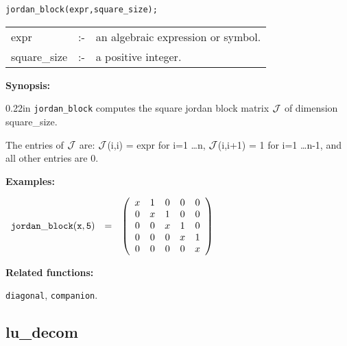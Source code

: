 
\hspace*{0.175in} {\tt jordan\_block(expr,square\_size);}

\hspace*{0.1in} 
\begin{tabular}{l l l}
expr        &:-& an algebraic expression or symbol. \\
square\_size &:-& a positive integer.
\end{tabular}

{\bf Synopsis:} %

\begin{addtolength}{\leftskip}{0.22in}
{\tt jordan\_block} computes the square jordan block matrix ${\cal J}$
                of dimension square\_size. 

The entries of ${\cal J}$ are:
                ${\cal J}$(i,i) = expr for i=1 
                \ldots n, ${\cal J}$(i,i+1) = 1 for i=1 
                \ldots n-1, and all other entries are 0.

\end{addtolength}

{\bf Examples:}

\begin{flushleft}  
\hspace*{0.1in}
\begin{math}        
\begin{array}{ccc}
{\tt jordan\_block(x,5)} & = & 
\left( \begin{array}{ccccc} x & 1 & 0 & 0 & 0 \\ 0 & x & 1 & 0 & 0 \\ 0 
& 0 & x & 1 & 0 \\ 0 & 0 & 0 & x & 1 \\ 0 & 0 & 0 & 0 & x
\end{array} \right)
\end{array}
\end{math}  
\end{flushleft}

{\bf Related functions:}

\hspace*{0.175in} {\tt diagonal}, {\tt companion}.


\subsection{lu\_decom}


